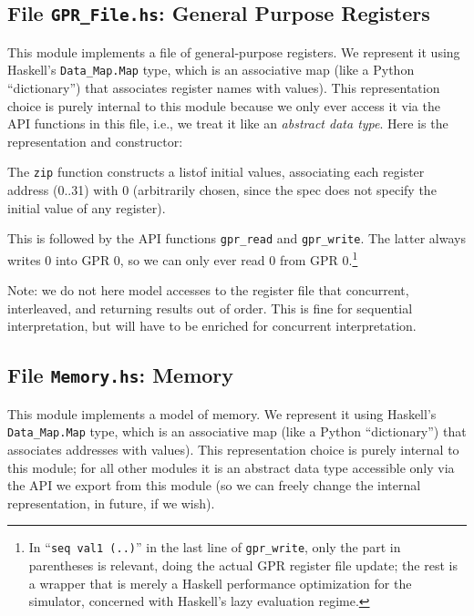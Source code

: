 \documentclass[11pt]{article}
\begin{document}
\subsection{File {\tt GPR\_File.hs}: General Purpose Registers}

\label{sec_gprs}

This module implements a file of general-purpose registers.  We
represent it using Haskell's \verb|Data_Map.Map| type, which is an
associative map (like a Python ``dictionary'') that associates
register names with values).  This representation choice is purely
internal to this module because we only ever access it via the API
functions in this file, i.e., we treat it like an \emph{abstract data
type}.  Here is the representation and constructor:



The \verb|zip| function constructs a listof initial values, associating
each register address (0..31) with 0 (arbitrarily chosen, since the
spec does not specify the initial value of any register).

This is followed by the API functions \verb|gpr_read| and
\verb|gpr_write|.  The latter always writes 0 into GPR 0, so we can
only ever read 0 from GPR 0.\footnote{In ``{\tt seq~val1~(..)}'' in
the last line of {\tt gpr\_write}, only the part in parentheses is
relevant, doing the actual GPR register file update; the rest is a
wrapper that is merely a Haskell performance optimization for the
simulator, concerned with Haskell's lazy evaluation regime.}

Note: we do not here model accesses to the register file that
concurrent, interleaved, and returning results out of order.  This is
fine for sequential interpretation, but will have to be enriched for
concurrent interpretation.


\subsection{File {\tt Memory.hs}: Memory}

\label{sec_memory}

This module implements a model of memory.  We represent it using
Haskell's \verb|Data_Map.Map| type, which is an associative map (like
a Python ``dictionary'') that associates addresses with values).  This
representation choice is purely internal to this module; for all other
modules it is an abstract data type accessible only via the API we
export from this module (so we can freely change the internal
representation, in future, if we wish).
\end{document}
